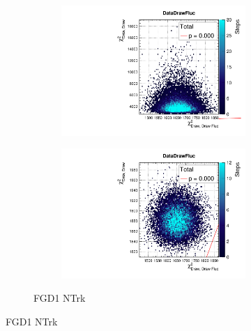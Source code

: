 \begin{figure}[h]
\begin{subfigure}[t]{\textwidth}
\begin{subfigure}[t]{0.24\textwidth}
\includegraphics[width=\textwidth, trim={0mm 0mm 0mm 8mm}, clip,page=74]{figures/mach3/data/priorpred/2017b_NewDet_3Xsec_4Det_5Flux_NewXSecTune_Data_merge_PriorPred_procs}
\end{subfigure}
	\begin{subfigure}[t]{0.24\textwidth}
		\includegraphics[width=\textwidth, trim={0mm 0mm 0mm 8mm}, clip,page=74]{figures/mach3/data/postpred/2017b_NewData_NewDet_UpdXsecStep_2Xsec_4Det_5Flux_0_PostPred_procs}
	\end{subfigure}
\caption{FGD1 NTrk}
\end{subfigure}


\end{figure}
